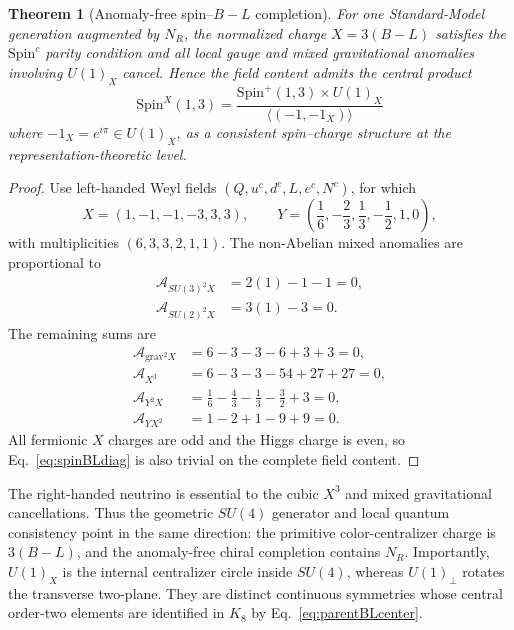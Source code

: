 \documentclass[11pt]{article}
\newtheorem{theorem}{Theorem}[section]
\theoremstyle{definition}\newtheorem{definition}[theorem]{Definition}
\theoremstyle{remark}\newtheorem{remark}[theorem]{Remark}\newtheorem{conjecture}[theorem]{Conjecture}
\begin{document}
\begin{theorem}[Anomaly-free spin--\texorpdfstring{$B-L$}{B-L} completion]\label{thm:BLspincompletion}
For one Standard-Model generation augmented by $N_R$, the normalized charge $X=3(B-L)$ satisfies the $\mathrm{Spin}^c$ parity condition and all local gauge and mixed gravitational anomalies involving $U(1)_X$ cancel. Hence the field content admits the central product
\begin{equation}\label{eq:spinBLgroup}
 \boxed{
 \mathrm{Spin}^{X}(1,3)
 =\frac{\mathrm{Spin}^+(1,3)\times U(1)_X}
 {\langle(-1,-1_X)\rangle}}
\end{equation}
where $-1_X=e^{i\pi}\in U(1)_X$, as a consistent spin--charge structure at the representation-theoretic level.
\end{theorem}
\begin{proof}
Use left-handed Weyl fields $(Q,u^c,d^c,L,e^c,N^c)$, for which
\begin{equation}
 X=(1,-1,-1,-3,3,3),
 \qquad
 Y=\left(\frac16,-\frac23,\frac13,-\frac12,1,0\right),
\end{equation}
with multiplicities $(6,3,3,2,1,1)$. The non-Abelian mixed anomalies are proportional to
\begin{align}
 \mathcal A_{SU(3)^2X}&=2(1)-1-1=0,\\
 \mathcal A_{SU(2)^2X}&=3(1)-3=0.
\end{align}
The remaining sums are
\begin{align}
 \mathcal A_{\mathrm{grav}^2X}
 &=6-3-3-6+3+3=0,\\
 \mathcal A_{X^3}
 &=6-3-3-54+27+27=0,\\
 \mathcal A_{Y^2X}
 &=\frac16-\frac43-\frac13-\frac32+3=0,\\
 \mathcal A_{YX^2}
 &=1-2+1-9+9=0.
\end{align}
All fermionic $X$ charges are odd and the Higgs charge is even, so Eq.~\eqref{eq:spinBLdiag} is also trivial on the complete field content.
\end{proof}

The right-handed neutrino is essential to the cubic $X^3$ and mixed gravitational cancellations. Thus the geometric $SU(4)$ generator and local quantum consistency point in the same direction: the primitive color-centralizer charge is $3(B-L)$, and the anomaly-free chiral completion contains $N_R$. Importantly, $U(1)_X$ is the internal centralizer circle inside $SU(4)$, whereas $U(1)_\perp$ rotates the transverse two-plane. They are distinct continuous symmetries whose central order-two elements are identified in $K_8$ by Eq.~\eqref{eq:parentBLcenter}.
\end{document}
